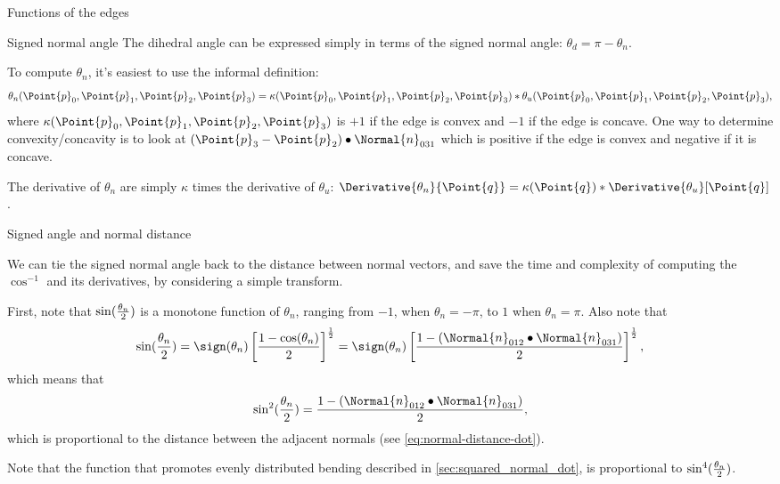 \begin{plSection}{Functions of the edges}
\begin{plSection}{Signed normal angle}
The dihedral angle can be expressed simply in terms of the
signed normal angle: $\theta_d = \pi - \theta_n$.

To compute $\theta_n$,
it's easiest to use the informal definition:
\begin{equation}
\theta_n(\Point{p}_0,\Point{p}_1,\Point{p}_2,\Point{p}_3)
= \kappa(\Point{p}_0,\Point{p}_1,\Point{p}_2,\Point{p}_3) \ast \theta_u(\Point{p}_0,\Point{p}_1,\Point{p}_2,\Point{p}_3),
\end{equation}
where $\kappa(\Point{p}_0,\Point{p}_1,\Point{p}_2,\Point{p}_3)$ is
$+1$ if the edge is convex
and
$-1$ if the edge is concave.
One way to determine convexity/concavity
is to look at
$\left(\Point{p}_3 - \Point{p}_2 \right) \bullet \Normal{n}_{031}$
which is positive if the edge is convex
and negative if it is concave.

The derivative of $\theta_n$ are simply $\kappa$
times the derivative of $\theta_u$:
$\Derivative{\theta_n}{\Point{q}} 
= 
\kappa(\Point{q}) \ast \Derivative{\theta_u}[\Point{q}]$.

\end{plSection}%

\begin{plSection}{Signed angle and normal distance}
\label{sec:Signed-angle-and-normal-distance}

We can tie the signed normal angle back 
to the distance between normal vectors,
and save the time and complexity
of computing the $\cos^{-1}$ and its derivatives,
by considering a simple transform.

First, note that $\sin({\theta_n \over 2})$
is a monotone function of $\theta_n$,
ranging from $-1$, when $\theta_n = -\pi$,
to $1$ when $\theta_n = \pi$.
Also note that 
\begin{equation}
\sin({\theta_n \over 2}) 
 = 
\sign(\theta_n) 
\left[ {1 - \cos(\theta_n)} 
\over 2 \right]^{1 \over 2}
 = 
\sign(\theta_n) 
\left[ {1 - \left( \Normal{n}_{012}\bullet\Normal{n}_{031} \right)} 
\over 2 \right]^{1 \over 2},
\end{equation}
which means that
\begin{equation}
\sin^2({\theta_n \over 2}) 
= {{1 - \left( \Normal{n}_{012}\bullet\Normal{n}_{031} \right)} \over 2},
\end{equation}
which is proportional to the distance between the adjacent normals
(see \cref{eq:normal-distance-dot}).

Note that the function that promotes evenly 
distributed bending described in \cref{sec:squared_normal_dot},
is proportional to $\sin^4({\theta_n \over 2})$. 


\end{plSection}
\end{plSection}
